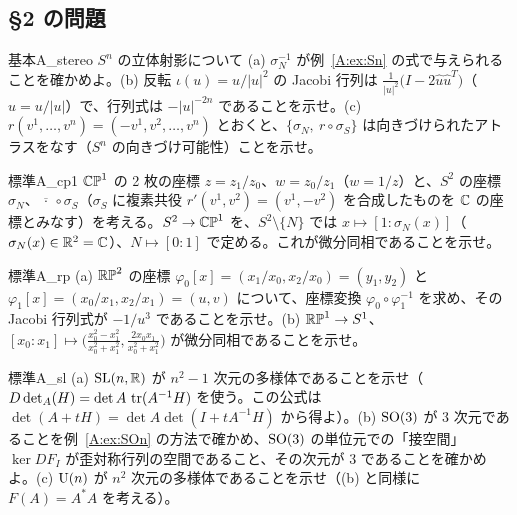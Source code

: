 \subsection*{§2 の問題}

\begin{probl}{基本}{A_stereo}
$S^n$ の立体射影について (a) $\sigma_N^{-1}$ が例~\ref{A:ex:Sn} の式で与えられることを確かめよ。(b) 反転 $\iota(u)=u/|u|^2$ の Jacobi 行列は $\frac1{|u|^2}\bigl(I-2\hat u\hat u^T\bigr)$（$\hat u=u/|u|$）で、行列式は $-|u|^{-2n}$ であることを示せ。(c) $r(v^1,\dots,v^n)=(-v^1,v^2,\dots,v^n)$ とおくと、$\{\sigma_N,\ r\circ\sigma_S\}$ は向きづけられたアトラスをなす（$S^n$ の向きづけ可能性）ことを示せ。
\end{probl}

\begin{probl}{標準}{A_cp1}
$\mathbb{CP}^1$ の 2 枚の座標 $z=z_1/z_0$、$w=z_0/z_1$（$w=1/z$）と、$S^2$ の座標 $\sigma_N$、$\overline{\ \cdot\ }\circ\sigma_S$（$\sigma_S$ に複素共役 $r'(v^1,v^2)=(v^1,-v^2)$ を合成したものを $\mathbb C$ の座標とみなす）を考える。$S^2\to\mathbb{CP}^1$ を、$S^2\setminus\{N\}$ では $x\mapsto[1:\sigma_N(x)]$（$\sigma_N(x)\in\mathbb R^2=\mathbb C$）、$N\mapsto[0:1]$ で定める。これが微分同相であることを示せ。
\end{probl}

\begin{probl}{標準}{A_rp}
(a) $\mathbb{RP}^2$ の座標 $\varphi_0[x]=(x_1/x_0,x_2/x_0)=(y_1,y_2)$ と $\varphi_1[x]=(x_0/x_1,x_2/x_1)=(u,v)$ について、座標変換 $\varphi_0\circ\varphi_1^{-1}$ を求め、その Jacobi 行列式が $-1/u^3$ であることを示せ。(b) $\mathbb{RP}^1\to S^1$、$[x_0:x_1]\mapsto\bigl(\frac{x_0^2-x_1^2}{x_0^2+x_1^2},\frac{2x_0x_1}{x_0^2+x_1^2}\bigr)$ が微分同相であることを示せ。
\end{probl}

\begin{probl}{標準}{A_sl}
(a) $\mathrm{SL}(n,\mathbb R)$ が $n^2-1$ 次元の多様体であることを示せ（\mbox{$D\det_A(H)=\det A\,\operatorname{tr}(A^{-1}H)$} を使う。この公式は $\det(A+tH)=\det A\det(I+tA^{-1}H)$ から得よ）。(b) $\mathrm{SO}(3)$ が 3 次元であることを例~\ref{A:ex:SOn} の方法で確かめ、$\mathrm{SO}(3)$ の単位元での「接空間」$\ker DF_I$ が歪対称行列の空間であること、その次元が 3 であることを確かめよ。(c) $\mathrm{U}(n)$ が $n^2$ 次元の多様体であることを示せ（(b) と同様に $F(A)=A^*A$ を考える）。
\end{probl}

